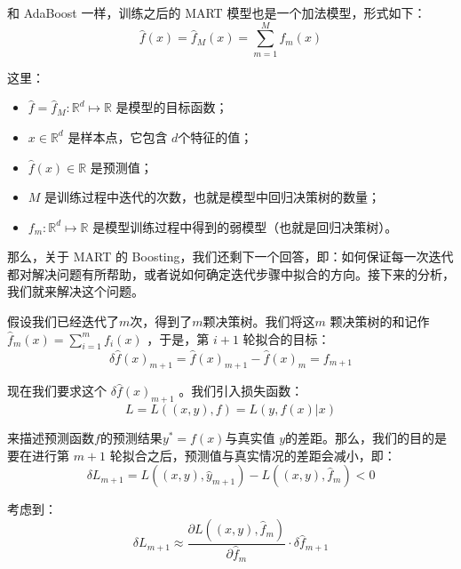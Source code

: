 \documentclass[12pt]{article}
\begin{document}
和 AdaBoost 一样，训练之后的 MART 模型也是一个加法模型，形式如下：
$$
\hat{f}(x) = \hat{f}_M(x) = \sum_{m=1}^Mf_m(x)
$$

这里：
\begin{itemize}
\setlength{\itemsep}{0pt}
\setlength{\parsep}{0pt}
\setlength{\parskip}{0pt}
    \item $\hat{f} = \hat{f}_M: \mathbb{R}^d \mapsto \mathbb{R}$ 是模型的目标函数；
    \item $x \in \mathbb{R}^d$ 是样本点，它包含  $d$个特征的值；
    \item $\hat{f}(x) \in \mathbb{R}$ 是预测值；
    \item $M$ 是训练过程中迭代的次数，也就是模型中回归决策树的数量；
    \item $f_m: \mathbb{R}^d \mapsto \mathbb{R}$ 是模型训练过程中得到的弱模型（也就是回归决策树）。
\end{itemize}

那么，关于 MART 的 Boosting，我们还剩下一个回答，即：如何保证每一次迭代都对解决问题有所帮助，或者说如何确定迭代步骤中拟合的方向。接下来的分析，我们就来解决这个问题。

假设我们已经迭代了$m$次，得到了$m$颗决策树。我们将这$m$  颗决策树的和记作 $\hat{f}_m(x) = \sum_{i=1}^mf_i(x)$
，于是，第 $i+1$ 轮拟合的目标：
$$
\delta \hat{f}(x)_{m+1} = \hat{f}(x)_{m+1} - \hat{f}(x)_{m} = f_{m+1}
$$

现在我们要求这个 $\delta \hat{f}(x)_{m+1}$
。我们引入损失函数：
$$
L = L((x,y),f) = L(y,f(x)|x)
$$

来描述预测函数$f$的预测结果$y^*=f(x)$与真实值
$y$的差距。那么，我们的目的是要在进行第 $m+1$ 轮拟合之后，预测值与真实情况的差距会减小，即：
$$
\delta L_{m+1} = L((x,y),\hat{y}_{m+1}) - L((x,y),\hat{f}_m) < 0
$$

考虑到：
$$
\delta L_{m+1} \approx \frac{\partial L((x,y),\hat{f}_m)}{\partial \hat{f}_m} \cdot \delta \hat{f}_{m+1}
$$



\end{document}

